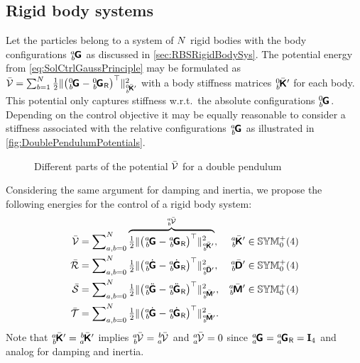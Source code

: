 \subsection{Rigid body systems}\label{sec:CtrlApproachParticlesRBS}
Let the particles belong to a system of $N$ rigid bodies with the body configurations $\bodyHomoCoord{\BidxI}{\BidxII}$ as discussed in \autoref{sec:RBSRigidBodySys}.
The potential energy from \eqref{eq:SolCtrlGaussPrinciple} may be formulated as $\potentialEnergyC = \sum_{\BidxII=1}^{\numRigidBodies} \tfrac{1}{2} \norm[\bodyStiffMatCp{0}{\BidxII}]{\big(\bodyHomoCoord{0}{\BidxII} - \bodyHomoCoordR{0}{\BidxII}\big)^\top}^2$ with a body stiffness matrices $\bodyStiffMatCp{0}{\BidxII}$ for each body.
This potential only captures stiffness w.r.t.\ the absolute configurations $\bodyHomoCoord{0}{\BidxII}$.
Depending on the control objective it may be equally reasonable to consider a stiffness associated with the relative configurations $\bodyHomoCoord{\BidxI}{\BidxII}$ as illustrated in \autoref{fig:DoublePendulumPotentials}.
\begin{figure}[ht]
 \centering
 
 \caption{Different parts of the potential $\bar{\mathcal{V}}$ for a double pendulum}
 \label{fig:DoublePendulumPotentials}
\end{figure}
Considering the same argument for damping and inertia, we propose the following energies for the control of a rigid body system:
\begin{subequations}\label{eq:RBSCtrlEnergies1}
\begin{align}
 \potentialEnergyC &= \sum\nolimits_{\BidxI,\BidxII=0}^{\numRigidBodies} \overbrace{\tfrac{1}{2} \norm[\bodyStiffMatCp{\BidxI}{\BidxII}]{\big(\bodyHomoCoord{\BidxI}{\BidxII} - \bodyHomoCoordR{\BidxI}{\BidxII}\big)^\top}^2}^{\bodyPotentialEnergyC{\BidxI}{\BidxII}},&
 \bodyStiffMatCp{\BidxI}{\BidxII} &\in \SymMatSP(4)
\\
 \dissFktC &= \sum\nolimits_{\BidxI,\BidxII=0}^{\numRigidBodies} \tfrac{1}{2} \norm[\bodyDissMatCp{\BidxI}{\BidxII}]{\big(\bodyHomoCoordd{\BidxI}{\BidxII} - \bodyHomoCoordRd{\BidxI}{\BidxII}\big)^\top}^2,&
 \bodyDissMatCp{\BidxI}{\BidxII} &\in \SymMatSP(4)
\\
 \accEnergyC &= \sum\nolimits_{\BidxI,\BidxII=0}^{\numRigidBodies} \tfrac{1}{2} \norm[\bodyInertiaMatCp{\BidxI}{\BidxII}]{\big(\bodyHomoCoorddd{\BidxI}{\BidxII} - \bodyHomoCoordRdd{\BidxI}{\BidxII}\big)^\top}^2,&
 \bodyInertiaMatCp{\BidxI}{\BidxII} &\in \SymMatSP(4)
 \label{eq:CtrlApproachParticlesRBSaccEnergyC}
\\
 \kineticEnergyC &= \sum\nolimits_{\BidxI,\BidxII=0}^{\numRigidBodies} \tfrac{1}{2} \norm[\bodyInertiaMatCp{\BidxI}{\BidxII}]{\big(\bodyHomoCoordd{\BidxI}{\BidxII} - \bodyHomoCoordRd{\BidxI}{\BidxII}\big)^\top}^2.
\end{align}
\end{subequations}
Note that $\bodyStiffMatCp{\BidxI}{\BidxII} = \bodyStiffMatCp{\BidxII}{\BidxI}$ implies $\bodyPotentialEnergyC{\BidxI}{\BidxII} = \bodyPotentialEnergyC{\BidxII}{\BidxI}$ and $\bodyPotentialEnergyC{\BidxI}{\BidxI} = 0$ since $\bodyHomoCoord{\BidxI}{\BidxI} = \bodyHomoCoordR{\BidxI}{\BidxI} = \idMat[4]$ and analog for damping and inertia.

